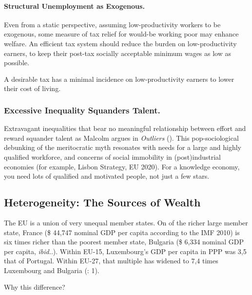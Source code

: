 \paragraph{Structural Unemployment as Exogenous.}
Even from a static perspective, assuming low-productivity workers to be exogenous, some measure of tax relief for would-be working poor may enhance welfare. An efficient tax system should reduce the burden on low-productivity earners, to keep their post-tax socially acceptable minimum wages as low as possible.
\newpage
\begin{desideratum}
	A desirable tax has a minimal incidence on low-productivity earners to lower their cost of living.
	\label{des:low-price-floor}
\end{desideratum}

\subsubsection{Excessive Inequality Squanders Talent.}
Extravagant inequalities that bear no meaningful relationship between effort and reward squander talent as Malcolm \citeauthor{Gladwell} argues in \emph{Outliers} (\citeyear{Gladwell}). This pop-sociological debunking of the meritocratic myth resonates with needs
for a large and highly qualified workforce, and concerns of social immobility in (post)industrial economies (for example, Lisbon Strategy, EU 2020). For a knowledge economy, you need lots of qualified and motivated people, not just a few stars.

\subsection[Heterogeneity]{Heterogeneity: The Sources of Wealth} \label{sec:sources-of-wealth} The \gls{EU} is a union of very unequal member states. On of the richer large member state, France (\$ 44,747 nominal \gls{GDP} per capita according to the IMF 2010) is six times richer than the poorest member state, Bulgaria (\$ 6,334 nominal \gls{GDP} per capita, \emph{ibid.}.). Within \gls{EU}-15, Luxembourg's \gls{GDP} per capita in \gls{PPP} was 3,5 that of Portugal. Within \gls{EU}-27, that multiple has widened to 7,4 times Luxembourg and Bulgaria (\citealt{Alber2008}: 1). %


Why this difference?

